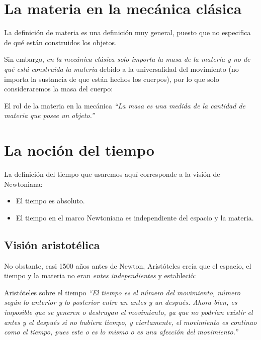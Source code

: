 \documentclass[../apunte_mecanica_clasica.tex]{subfiles}%
\begin{document}
\section{La materia en la mecánica clásica}

La definición de materia es una definición muy general, puesto que no especifica de qué están construidos los objetos.

Sin embargo, \textit{en la mecánica clásica solo importa la masa de la materia y no de qué está construida la materia} debido a la universalidad del movimiento (no importa la sustancia de que están hechos los cuerpos), por lo que solo consideraremos la masa del cuerpo:

\begin{apuntebloque}{El rol de la materia en la mecánica}
\textit{``La masa es una medida de la cantidad de materia que posee un objeto.''}
\end{apuntebloque}

\section{La noción del tiempo}

La definición del tiempo que usaremos aquí corresponde a la visión de Newtoniana:
\begin{itemize}
    \item El tiempo es absoluto.
    \item El tiempo en el marco Newtoniana es independiente del espacio y la materia.
\end{itemize} 

\subsection*{Visión aristotélica}

No obstante, casi 1500 años antes de Newton, Aristóteles creía que el espacio, el tiempo y la materia no eran \textit{entes independientes} y estableció:

\begin{apuntebloque}{Aristóteles sobre el tiempo}
\textit{``El tiempo es el número del movimiento, número según lo anterior y lo posterior entre un antes y un después. Ahora bien, es imposible que se generen o destruyan el movimiento, ya que no podrían existir el antes y el después si no hubiera tiempo, y ciertamente, el movimiento es continuo como el tiempo, pues este o es lo mismo o es una afección del movimiento.''}
\end{apuntebloque}
\end{document}
